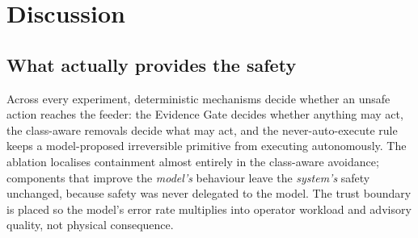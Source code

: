 \section{Discussion}
\label{sec:discussion}

\subsection{What actually provides the safety}
\label{sec:disc-safety}
Across every experiment, deterministic mechanisms decide whether an unsafe action
reaches the feeder: the Evidence Gate decides whether anything may act, the
class-aware removals decide what may act, and the never-auto-execute rule
keeps a model-proposed irreversible primitive from executing autonomously. The ablation
localises containment almost entirely in the class-aware avoidance; components
that improve the \emph{model's} behaviour leave the \emph{system's} safety
unchanged, because safety was never delegated to the model. The trust boundary is
placed so the model's error rate multiplies into operator workload and advisory
quality, not physical consequence.


